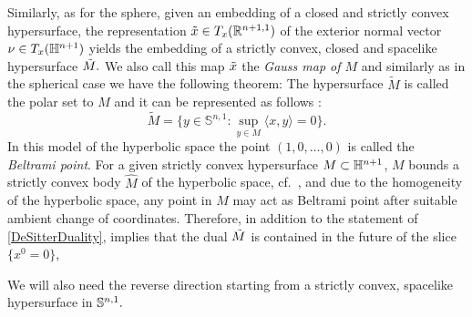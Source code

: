 Similarly, as for the sphere, given an embedding
of a closed and strictly convex hypersurface, the representation $\~x\in T_x(\R^{n+1,1})$ of the exterior normal vector $\nu\in T_x(\H^{n+1})$ yields the embedding
of a strictly convex, closed and spacelike hypersurface $\~M.$
We also call this map $\~x$ the {\it{Gauss map of $M$}} and similarly as in the spherical case we have the following theorem:
The hypersurface $\tilde{M}$ is called the polar set to $M$ and it can be represented as follows \cite[Thm.~10.4.8]{Gerhardt:/2006}:
$$\tilde{M}=\{y\in \mathbb{S}^{n,1}: \sup_{y\in M}\langle x,y\rangle=0\}.$$
In this model of the hyperbolic space the point $(1,0,\ldots,0)$ is called the {\it{Beltrami point}}. For a given strictly convex hypersurface $M\sub\H^{n+1}$, $M$ bounds a strictly convex body $\hat{M}$ of the hyperbolic space, cf.~\cite[Thm.~10.3.1]{Gerhardt:/2006}, and due to the homogeneity of the hyperbolic space, any point in $\hat{M}$ may act as Beltrami point after suitable ambient change of coordinates. Therefore, in addition to the statement of \cref{DeSitterDuality}, \cite[Thm.~10.4.9.]{Gerhardt:/2006} implies that the dual $\~M$ is contained in the future of the slice $\{x^0=0\}$,

We will also need the reverse direction starting from a strictly convex, spacelike hypersurface in $\S^{n,1}.$

